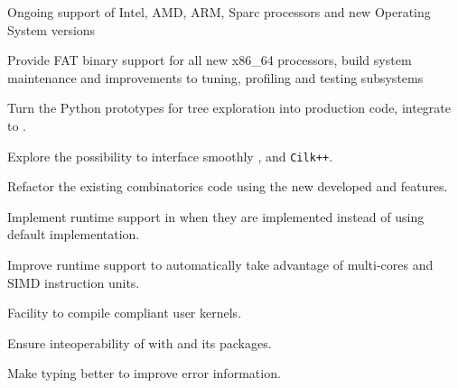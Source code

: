 \begin{workpackage}[id=hpc,wphases=36-48,
  title=High Performance Computing,
  PSRM=1, %
  LLRM=12, %
  SARM=1, %
  UKRM=1, %
  UBRM=1, %
  UJFRM=12]
\begin{wpdelivs}
\begin{wpdeliv}[due=24,id=MPIRprocessors,dissem=??,nature=??]
      {Ongoing support of Intel, AMD, ARM, Sparc processors and new Operating System versions}
\end{wpdeliv}
  \begin{wpdeliv}[due=12,id=MPIRfat,dissem=??,nature=??]
      {Provide FAT binary support for all new x86\_64 processors, build system maintenance and improvements to tuning, profiling and testing subsystems}
\end{wpdeliv}
  \begin{wpdeliv}[due=3,id=HPCcombi,dissem=??,nature=??]
      {Turn the Python prototypes for tree exploration into    production code, integrate to \Sage.}
\end{wpdeliv}
  \begin{wpdeliv}[due=12,id=HPCcombi,dissem=??,nature=??]
      {Explore the possibility to    interface smoothly \Pythran, \Cython and \texttt{Cilk++}.}
\end{wpdeliv}
  \begin{wpdeliv}[due=24,id=HPCcombi,dissem=??,nature=??]
      {Refactor the existing combinatorics \Sage    code using the new developed  \Pythran and \Cython features.}
\end{wpdeliv}
  \begin{wpdeliv}[due=6,id=pythran_cython,dissem=??,nature=??]
      {Implement \Pythran runtime support in \Cython when they are implemented instead of using default implementation.}
\end{wpdeliv}
  \begin{wpdeliv}[due=3,id=pythran_runtime,dissem=??,nature=??]
      {Improve \Pythran runtime support to automatically take advantage of multi-cores and SIMD instruction units.}
\end{wpdeliv}
  \begin{wpdeliv}[due=2,id=pythran_sage,dissem=??,nature=??]
      {Facility to compile \Pythran compliant user kernels.}
\end{wpdeliv}
  \begin{wpdeliv}[due=1,id=pythran,dissem=??,nature=??]
      {Ensure inteoperability of \Pythran with \Python and its packages.}
\end{wpdeliv}
  \begin{wpdeliv}[due=12,id=pythran_typing,dissem=??,nature=??]
      {Make \Pythran typing better to improve error information.}
\end{wpdeliv}
\end{wpdelivs}
\end{workpackage}
